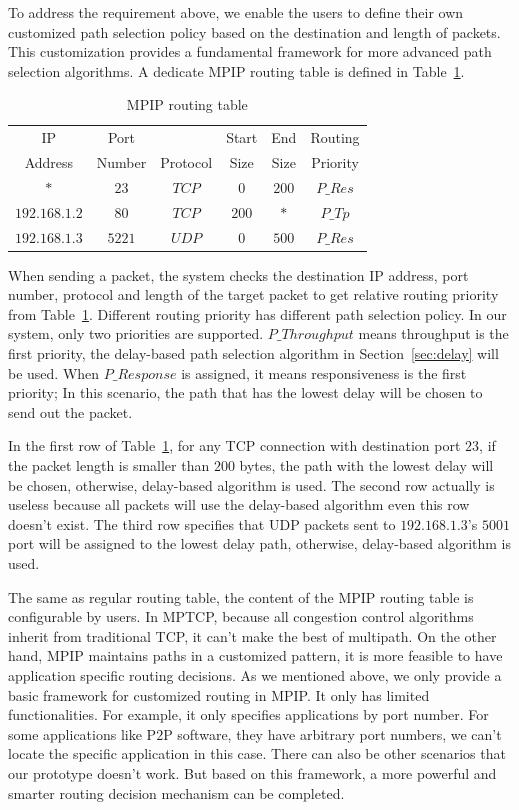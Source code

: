 To address the requirement above, we enable the users to define their own customized path selection policy based on the destination and length of packets. This customization provides a fundamental framework for more advanced path selection algorithms. A dedicate MPIP routing table is defined in Table~\ref{tb.route}.

\begin{table}[htbp]
\caption{\label{tb.route}MPIP routing table}
\centering
\begin{tabular}{|c|c|c|c|c|c|}
\hline
 IP   		&   Port   &          & Start  & End    & Routing       \\
 Address    &  Number     & Protocol & Size   & Size & Priority       \\
\hline
$*$&$23$&$TCP$&$0$&$200$&$P\_Res$   \\
\hline
$192.168.1.2$&$80$&$TCP$&$200$&$*$&$P\_Tp$   \\
\hline
$192.168.1.3$&$5221$&$UDP$&$0$&$500$&$P\_Res$  \\
\hline
\end{tabular}
\end{table}

When sending a packet, the system checks the destination IP address, port number, protocol and length of the target packet to get relative routing priority from Table~\ref{tb.route}. Different routing priority has different path selection policy. In our system, only two priorities are supported. $P\_Throughput$ means throughput is the first priority, the delay-based path selection algorithm in Section~\ref{sec:delay} will be used. When $P\_Response$ is assigned, it means responsiveness is the first priority; In this scenario, the path that has the lowest delay will be chosen to send out the packet.

In the first row of Table~\ref{tb.route}, for any TCP connection with destination port $23$, if the packet length is smaller than $200$ bytes, the path with the lowest delay will be chosen, otherwise, delay-based algorithm is used. The second row actually is useless because all packets will use the delay-based algorithm even this row doesn't exist. The third row specifies that UDP packets sent to $192.168.1.3$'s $5001$ port will be assigned to the lowest delay path, otherwise, delay-based algorithm is used.

The same as regular routing table, the content of the MPIP routing table is configurable by users. In MPTCP, because all congestion control algorithms inherit from traditional TCP, it can't make the best of multipath. On the other hand, MPIP maintains paths in a customized pattern, it is more feasible to have application specific routing decisions. As we mentioned above, we only provide a basic framework for customized routing in MPIP. It only has limited functionalities. For example, it only  specifies applications by port number. For some applications like P$2$P software, they have arbitrary port numbers, we can't locate the specific application in this case. There can also be other scenarios that our prototype doesn't work. But based on this framework, a more powerful and smarter routing decision mechanism can be completed.

